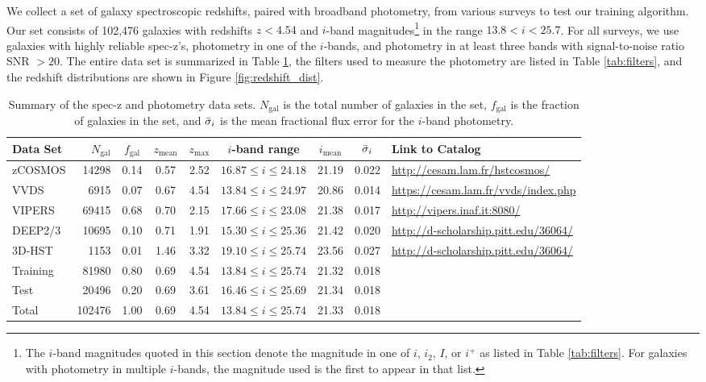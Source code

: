 
\label{sect:data}

We collect a set of galaxy spectroscopic redshifts, paired with broadband photometry, from various surveys to test our training algorithm.
Our set consists of 102,476 galaxies with redshifts $z < 4.54$ and $i$-band magnitudes\footnote{The $i$-band magnitudes quoted in this section denote the magnitude in one of $i$, $i_2$, $I$, or $i^+$ as listed in Table \ref{tab:filters}. For galaxies with photometry in multiple $i$-bands, the magnitude used is the first to appear in that list.} in the range $13.8 < i < 25.7$.
For all surveys, we use galaxies with highly reliable spec-z's, photometry in one of the $i$-bands, and photometry in at least three bands with signal-to-noise ratio SNR $> 20$.
The entire data set is summarized in Table \ref{tab:data_sets}, the filters used to measure the photometry are listed in Table \ref{tab:filters}, and the redshift distributions are shown in Figure \ref{fig:redshift_dist}.

\begin{table}
    \caption{Summary of the spec-z and photometry data sets. $N_\text{gal}$ is the total number of galaxies in the set, $f_\text{gal}$ is the fraction of galaxies in the set, and $\Bar{\sigma}_i$ is the mean fractional flux error for the $i$-band photometry.}
    \label{tab:data_sets}
    \centering
    \begin{tabular}{l r c c c c c c l}
        \toprule \toprule
        Data Set & $N_\text{gal}$ & $f_\text{gal}$ & $z_\text{mean}$ & $z_\text{max}$ & $i$-band range & $i_\text{mean}$ & $\Bar{\sigma}_i$ & Link to Catalog \\
        \midrule
        
        zCOSMOS  &  14298 & 0.14 & 0.57 & 2.52 & $16.87 \leq i \leq 24.18$ & 21.19 & 0.022 & \url{http://cesam.lam.fr/hstcosmos/} \\
        VVDS     &   6915 & 0.07 & 0.67 & 4.54 & $13.84 \leq i \leq 24.97$ & 20.86 & 0.014 & \url{https://cesam.lam.fr/vvds/index.php} \\
        VIPERS   &  69415 & 0.68 & 0.70 & 2.15 & $17.66 \leq i \leq 23.08$ & 21.38 & 0.017 & \url{http://vipers.inaf.it:8080/} \\
        DEEP2/3  &  10695 & 0.10 & 0.71 & 1.91 & $15.30 \leq i \leq 25.36$ & 21.42 & 0.020 & \url{http://d-scholarship.pitt.edu/36064/} \\
        3D-HST   &   1153 & 0.01 & 1.46 & 3.32 & $19.10 \leq i \leq 25.74$ & 23.56 & 0.027 & \url{http://d-scholarship.pitt.edu/36064/} \\
        \midrule
        Training &  81980 & 0.80 & 0.69 & 4.54 & $13.84 \leq i \leq 25.74$ & 21.32 & 0.018 & \\
        Test     &  20496 & 0.20 & 0.69 & 3.61 & $16.46 \leq i \leq 25.69$ & 21.34 & 0.018 & \\
        \midrule
        Total    & 102476 & 1.00 & 0.69 & 4.54 & $13.84 \leq i \leq 25.74$ & 21.33 & 0.018 & \\
        
        \bottomrule
    \end{tabular}
\end{table}

